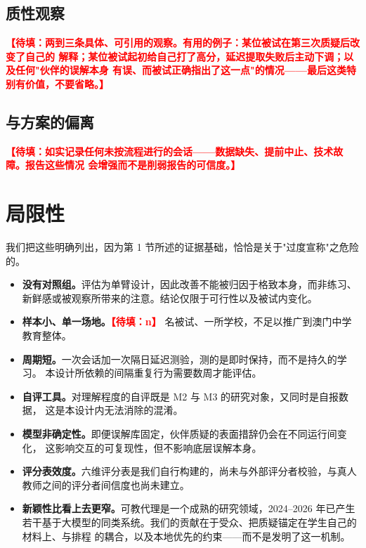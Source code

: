 \documentclass[11pt,a4paper,UTF8,fontset=windows]{ctexart}
\newcommand{\fillin}[1]{\textcolor{red}{\textbf{【待填：#1】}}}
\begin{document}
\subsection{质性观察}

\fillin{两到三条具体、可引用的观察。有用的例子：某位被试在第三次质疑后改变了自己的
解释；某位被试起初给自己打了高分，延迟提取失败后主动下调；以及任何"伙伴的误解本身
有误、而被试正确指出了这一点"的情况——最后这类特别有价值，不要省略。}

\subsection{与方案的偏离}

\fillin{如实记录任何未按流程进行的会话——数据缺失、提前中止、技术故障。报告这些情况
会增强而不是削弱报告的可信度。}

\section{局限性}

我们把这些明确列出，因为第 1 节所述的证据基础，恰恰是关于"过度宣称"之危险的。

\begin{itemize}
  \item \textbf{没有对照组。}评估为单臂设计，因此改善不能被归因于格致本身，而非练习、
  新鲜感或被观察所带来的注意。结论仅限于可行性以及被试内变化。
  \item \textbf{样本小、单一场地。}\fillin{n} 名被试、一所学校，不足以推广到澳门中学
  教育整体。
  \item \textbf{周期短。}一次会话加一次隔日延迟测验，测的是即时保持，而不是持久的学习。
  本设计所依赖的间隔重复行为需要数周才能评估。
  \item \textbf{自评工具。}对理解程度的自评既是 M2 与 M3 的研究对象，又同时是自报数据，
  这是本设计内无法消除的混淆。
  \item \textbf{模型非确定性。}即便误解库固定，伙伴质疑的表面措辞仍会在不同运行间变化，
  这影响交互的可复现性，但不影响底层误解本身。
  \item \textbf{评分表效度。}六维评分表是我们自行构建的，尚未与外部评分者校验，与真人
  教师之间的评分者间信度也尚未建立。
  \item \textbf{新颖性比看上去更窄。}可教代理是一个成熟的研究领域，2024--2026 年已产生
  若干基于大模型的同类系统。我们的贡献在于受众、把质疑锚定在学生自己的材料上、与排程
  的耦合，以及本地优先的约束——而不是发明了这一机制。
\end{itemize}
\end{document}
